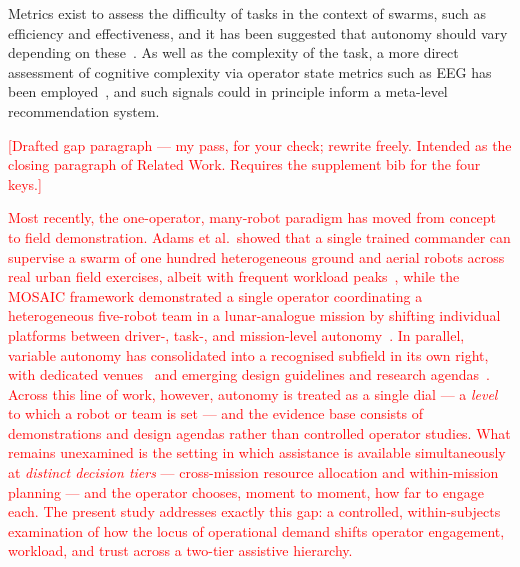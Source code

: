 \documentclass[10pt]{article}
\theoremstyle{definition}
\begin{document}
Metrics exist to assess the difficulty of tasks in the context of swarms, such as efficiency and effectiveness, and it has been suggested that autonomy should vary depending on these~\cite{hussein_characterization_2022}. As well as the complexity of the task, a more direct assessment of cognitive complexity via operator state metrics such as EEG has been employed~\cite{abbass_augmented_2014}, and such signals could in principle inform a meta-level recommendation system.

\textcolor{red}{[Drafted gap paragraph --- my pass, for your check; rewrite freely. Intended as the closing paragraph of Related Work. Requires the supplement bib for the four keys.]}

\textcolor{red}{Most recently, the one-operator, many-robot paradigm has moved from concept to field demonstration. Adams et al.\ showed that a single trained commander can supervise a swarm of one hundred heterogeneous ground and aerial robots across real urban field exercises, albeit with frequent workload peaks~\cite{adams2025supervise}, while the MOSAIC framework demonstrated a single operator coordinating a heterogeneous five-robot team in a lunar-analogue mission by shifting individual platforms between driver-, task-, and mission-level autonomy~\cite{oberacker2026mosaic}. In parallel, variable autonomy has consolidated into a recognised subfield in its own right, with dedicated venues~\cite{theodorou2024editorial} and emerging design guidelines and research agendas~\cite{reinmund2024variable}. Across this line of work, however, autonomy is treated as a single dial --- a \emph{level} to which a robot or team is set --- and the evidence base consists of demonstrations and design agendas rather than controlled operator studies. What remains unexamined is the setting in which assistance is available simultaneously at \emph{distinct decision tiers} --- cross-mission resource allocation and within-mission planning --- and the operator chooses, moment to moment, how far to engage each. The present study addresses exactly this gap: a controlled, within-subjects examination of how the locus of operational demand shifts operator engagement, workload, and trust across a two-tier assistive hierarchy.}
\end{document}

